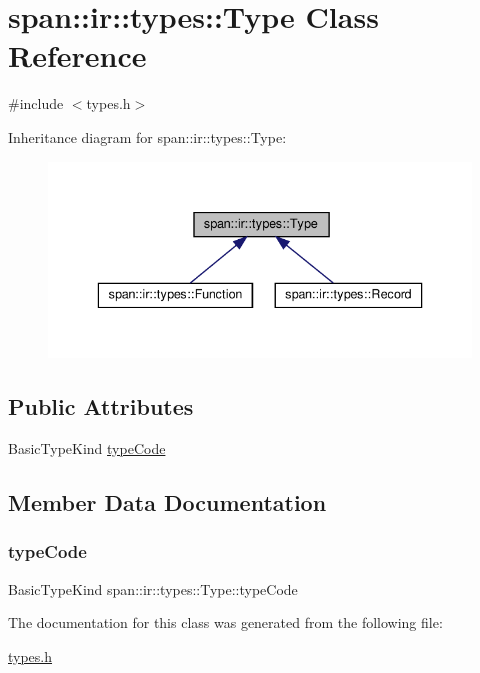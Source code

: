 \hypertarget{classspan_1_1ir_1_1types_1_1Type}{}\section{span\+:\+:ir\+:\+:types\+:\+:Type Class Reference}
\label{classspan_1_1ir_1_1types_1_1Type}


{\ttfamily \#include $<$types.\+h$>$}



Inheritance diagram for span\+:\+:ir\+:\+:types\+:\+:Type\+:\nopagebreak
\begin{figure}[H]
\begin{center}
\leavevmode
\includegraphics[width=336pt]{classspan_1_1ir_1_1types_1_1Type__inherit__graph}
\end{center}
\end{figure}
\subsection*{Public Attributes}
\begin{DoxyCompactItemize}
\item 
Basic\+Type\+Kind \hyperlink{classspan_1_1ir_1_1types_1_1Type_a9736ff7f6ff2abb2e851e9f2898613f3}{type\+Code}
\end{DoxyCompactItemize}


\subsection{Member Data Documentation}
\mbox{\label{classspan_1_1ir_1_1types_1_1Type_a9736ff7f6ff2abb2e851e9f2898613f3}} 
\subsubsection{\texorpdfstring{type\+Code}{typeCode}}
{\footnotesize\ttfamily Basic\+Type\+Kind span\+::ir\+::types\+::\+Type\+::type\+Code}



The documentation for this class was generated from the following file\+:\begin{DoxyCompactItemize}
\item 
\hyperlink{types_8h}{types.\+h}\end{DoxyCompactItemize}
